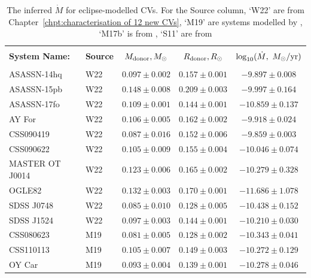 \begin{table}
    \centering
    \caption{The inferred $\dot M$ for eclipse-modelled CVs. For the Source column, `W22' are from Chapter~\ref{chpt:characterisation of 12 new CVs}, `M19' are systems modelled by \citet{McAllister2019}, `M17b' is from \citet{mcallister2017b}, `S11' are from \citet{Savoury2011}}
    \label{table:results:mdot modelling}
    \begin{tabular}{llccc}
        \hline \\
        {\bf System Name:} & \textbf{Source} & \textbf{$M_{\rm donor}, M_\odot$}  & \textbf{$R_{\rm donor}, R_\odot$}  & \textbf{$\log_{10}(\dot M,\ M_\odot / {\rm yr})$} \\
        \hline \hline \\
        ASASSN-14hq         &  W22      & $0.097 \pm 0.002$ & $0.157 \pm 0.001$ & $ -9.897 \pm 0.008$ \\
        ASASSN-15pb         &  W22      & $0.148 \pm 0.008$ & $0.209 \pm 0.003$ & $ -9.997 \pm 0.164$ \\
        ASASSN-17fo         &  W22      & $0.109 \pm 0.001$ & $0.144 \pm 0.001$ & $-10.859 \pm 0.137$ \\
        AY For              &  W22      & $0.106 \pm 0.005$ & $0.162 \pm 0.002$ & $ -9.918 \pm 0.024$ \\
        CSS090419           &  W22      & $0.087 \pm 0.016$ & $0.152 \pm 0.006$ & $ -9.859 \pm 0.003$ \\
        CSS090622           &  W22      & $0.105 \pm 0.009$ & $0.155 \pm 0.004$ & $-10.046 \pm 0.074$ \\
        MASTER OT J0014     &  W22      & $0.123 \pm 0.006$ & $0.165 \pm 0.002$ & $-10.279 \pm 0.328$ \\
        OGLE82              &  W22      & $0.132 \pm 0.003$ & $0.170 \pm 0.001$ & $-11.686 \pm 1.078$ \\
        SDSS J0748          &  W22      & $0.085 \pm 0.010$ & $0.128 \pm 0.005$ & $-10.438 \pm 0.152$ \\
        SDSS J1524          &  W22      & $0.097 \pm 0.003$ & $0.144 \pm 0.001$ & $-10.210 \pm 0.030$ \\
        CSS080623           &  M19      & $0.081 \pm 0.005$ & $0.128 \pm 0.002$ & $-10.343 \pm 0.041$ \\
        CSS110113           &  M19      & $0.105 \pm 0.007$ & $0.149 \pm 0.003$ & $-10.272 \pm 0.129$ \\
        OY Car              &  M19      & $0.093 \pm 0.004$ & $0.139 \pm 0.001$ & $-10.278 \pm 0.046$ \\

\end{tabular}
\end{table}
